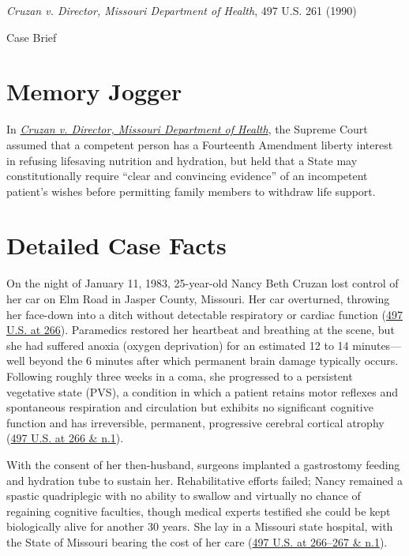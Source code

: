 \documentclass[12pt]{article}
\begin{document}
\begin{center}
{\LARGE \textit{Cruzan v. Director, Missouri Department of Health}, 497 U.S. 261 (1990)\par}
\vspace{0.8em}
{\large Case Brief\par}
\end{center}
\vspace{1em}

\section{Memory Jogger}

In \href{https://www.courtlistener.com/opinion/112478/cruzan-ex-rel-cruzan-v-director-missouri-department-of-health/}{\textit{Cruzan v. Director, Missouri Department of Health}}, the Supreme Court assumed that a competent person has a Fourteenth Amendment liberty interest in refusing lifesaving nutrition and hydration, but held that a State may constitutionally require ``clear and convincing evidence'' of an incompetent patient's wishes before permitting family members to withdraw life support.

\section{Detailed Case Facts}

On the night of January 11, 1983, 25-year-old Nancy Beth Cruzan lost control of her car on Elm Road in Jasper County, Missouri. Her car overturned, throwing her face-down into a ditch without detectable respiratory or cardiac function (\href{https://supreme.justia.com/cases/federal/us/497/261/}{497 U.S. at 266}). Paramedics restored her heartbeat and breathing at the scene, but she had suffered anoxia (oxygen deprivation) for an estimated 12 to 14 minutes---well beyond the 6 minutes after which permanent brain damage typically occurs. Following roughly three weeks in a coma, she progressed to a persistent vegetative state (PVS), a condition in which a patient retains motor reflexes and spontaneous respiration and circulation but exhibits no significant cognitive function and has irreversible, permanent, progressive cerebral cortical atrophy (\href{https://supreme.justia.com/cases/federal/us/497/261/}{497 U.S. at 266 \& n.1}).

With the consent of her then-husband, surgeons implanted a gastrostomy feeding and hydration tube to sustain her. Rehabilitative efforts failed; Nancy remained a spastic quadriplegic with no ability to swallow and virtually no chance of regaining cognitive faculties, though medical experts testified she could be kept biologically alive for another 30 years. She lay in a Missouri state hospital, with the State of Missouri bearing the cost of her care (\href{https://supreme.justia.com/cases/federal/us/497/261/}{497 U.S. at 266--267 \& n.1}).
\end{document}
